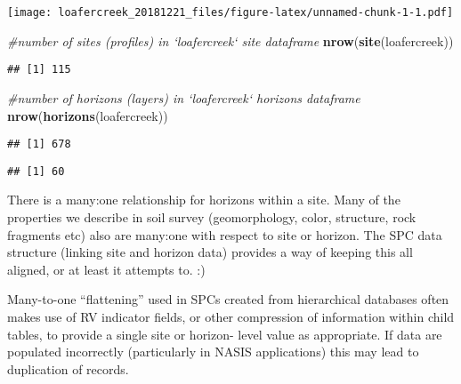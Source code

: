 \documentclass[]{article}
\newenvironment{Shaded}{\begin{snugshade}}{\end{snugshade}}
\newcommand{\KeywordTok}[1]{\textcolor[rgb]{0.13,0.29,0.53}{\textbf{#1}}}
\newcommand{\DataTypeTok}[1]{\textcolor[rgb]{0.13,0.29,0.53}{#1}}
\newcommand{\CommentTok}[1]{\textcolor[rgb]{0.56,0.35,0.01}{\textit{#1}}}
\newcommand{\OtherTok}[1]{\textcolor[rgb]{0.56,0.35,0.01}{#1}}
\newcommand{\OperatorTok}[1]{\textcolor[rgb]{0.81,0.36,0.00}{\textbf{#1}}}
\newcommand{\NormalTok}[1]{#1}
\begin{document}
\texttt{[image: loafercreek\_20181221\_files/figure-latex/unnamed-chunk-1-1.pdf]}

\begin{Shaded}
\begin{Highlighting}[]
\CommentTok{#number of sites (profiles) in `loafercreek` site dataframe}
\KeywordTok{nrow}\NormalTok{(}\KeywordTok{site}\NormalTok{(loafercreek))}
\end{Highlighting}
\end{Shaded}

\begin{verbatim}
## [1] 115
\end{verbatim}

\begin{Shaded}
\begin{Highlighting}[]
\CommentTok{#number of horizons (layers) in `loafercreek` horizons dataframe}
\KeywordTok{nrow}\NormalTok{(}\KeywordTok{horizons}\NormalTok{(loafercreek))}
\end{Highlighting}
\end{Shaded}

\begin{verbatim}
## [1] 678
\end{verbatim}

\begin{Shaded}
\end{Shaded}

\begin{verbatim}
## [1] 60
\end{verbatim}

There is a many:one relationship for horizons within a site. Many of the
properties we describe in soil survey (geomorphology, color, structure,
rock fragments etc) also are many:one with respect to site or horizon.
The SPC data structure (linking site and horizon data) provides a way of
keeping this all aligned, or at least it attempts to. :)

Many-to-one ``flattening'' used in SPCs created from hierarchical
databases often makes use of RV indicator fields, or other compression
of information within child tables, to provide a single site or horizon-
level value as appropriate. If data are populated incorrectly
(particularly in NASIS applications) this may lead to duplication of
records.
\end{document}
